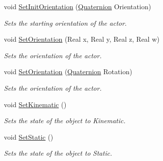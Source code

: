 \begin{DoxyCompactItemize}
void \hyperlink{classActorBase_a968b3c8b29aac97b5240cf933783865b}{SetInitOrientation} (\hyperlink{classphys_1_1Quaternion}{Quaternion} Orientation)
\begin{DoxyCompactList}\small\item\em Sets the starting orientation of the actor. \item\end{DoxyCompactList}\item 
void \hyperlink{classActorBase_a676bcd5370c2e4a4e81d8bde7ed3970f}{SetOrientation} (Real x, Real y, Real z, Real w)
\begin{DoxyCompactList}\small\item\em Sets the orientation of the actor. \item\end{DoxyCompactList}\item 
void \hyperlink{classActorBase_a66429021cfc19b32cd0f645955e20584}{SetOrientation} (\hyperlink{classphys_1_1Quaternion}{Quaternion} Rotation)
\begin{DoxyCompactList}\small\item\em Sets the orientation of the actor. \item\end{DoxyCompactList}\item 
void \hyperlink{classActorBase_a2d5f990e8c6925b7e44e9ec85f379e6a}{SetKinematic} ()
\begin{DoxyCompactList}\small\item\em Sets the state of the object to Kinematic. \item\end{DoxyCompactList}\item 
void \hyperlink{classActorBase_a97f55e5fff5d69483ebb0b9042a50bb0}{SetStatic} ()
\begin{DoxyCompactList}\small\item\em Sets the state of the object to Static. \item\end{DoxyCompactList}\end{DoxyCompactItemize}
